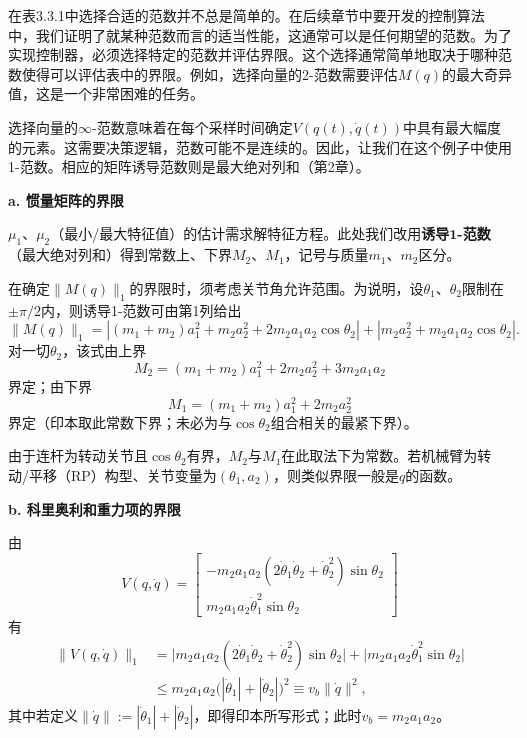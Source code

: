 \documentclass[12pt,a4paper]{ctexart}
\begin{document}
在表3.3.1中选择合适的范数并不总是简单的。在后续章节中要开发的控制算法中，我们证明了就某种范数而言的适当性能，这通常可以是任何期望的范数。为了实现控制器，必须选择特定的范数并评估界限。这个选择通常简单地取决于哪种范数使得可以评估表中的界限。例如，选择向量的2-范数需要评估$M(q)$的最大奇异值，这是一个非常困难的任务。

选择向量的$\infty$-范数意味着在每个采样时间确定$V(q(t),\dot{q}(t))$中具有最大幅度的元素。这需要决策逻辑，范数可能不是连续的。因此，让我们在这个例子中使用1-范数。相应的矩阵诱导范数则是最大绝对列和（第2章）。

\textbf{a. 惯量矩阵的界限}

$\mu_1$、$\mu_2$（最小/最大特征值）的估计需求解特征方程。此处我们改用\textbf{诱导$\mathbf{1}$-范数}（最大绝对列和）得到常数上、下界$M_2$、$M_1$，记号与质量$m_1$、$m_2$区分。

在确定$\|M(q)\|_1$的界限时，须考虑关节角允许范围。为说明，设$\theta_1$、$\theta_2$限制在$\pm\pi/2$内，则诱导1-范数可由第1列给出
\begin{equation}
\|M(q)\|_1 = |(m_1+m_2)a_1^2 + m_2a_2^2 + 2m_2a_1a_2\cos\theta_2| + |m_2a_2^2 + m_2a_1a_2\cos\theta_2|.
\end{equation}
对一切$\theta_2$，该式由上界
\begin{equation}
M_2 = (m_1+m_2)a_1^2 + 2m_2a_2^2 + 3m_2a_1a_2
\end{equation}
界定；由下界
\begin{equation}
M_1 = (m_1+m_2)a_1^2 + 2m_2a_2^2
\end{equation}
界定（印本取此常数下界；未必为与$\cos\theta_2$组合相关的最紧下界）。

由于连杆为转动关节且$\cos\theta_2$有界，$M_2$与$M_1$在此取法下为常数。若机械臂为转动/平移（RP）构型、关节变量为$(\theta_1,a_2)$，则类似界限一般是$q$的函数。

\textbf{b. 科里奥利和重力项的界限}

由
\begin{equation}
V(q,\dot{q}) = \begin{bmatrix} -m_2a_1a_2(2\dot{\theta}_1\dot{\theta}_2 + \dot{\theta}_2^2)\sin\theta_2 \\ m_2a_1a_2\dot{\theta}_1^2\sin\theta_2 \end{bmatrix}
\end{equation}
有
\begin{equation}
\begin{aligned}
\|V(q,\dot{q})\|_1 &= \bigl|m_2a_1a_2(2\dot{\theta}_1\dot{\theta}_2 + \dot{\theta}_2^2)\sin\theta_2\bigr| + \bigl|m_2a_1a_2\dot{\theta}_1^2\sin\theta_2\bigr| \\
&\leq m_2a_1a_2\bigl(|\dot{\theta}_1| + |\dot{\theta}_2|\bigr)^2 \equiv v_b \|\dot{q}\|^2,
\end{aligned}
\end{equation}
其中若定义$\|\dot{q}\|:=|\dot{\theta}_1|+|\dot{\theta}_2|$，即得印本所写形式；此时$v_b = m_2a_1a_2$。
\end{document}

